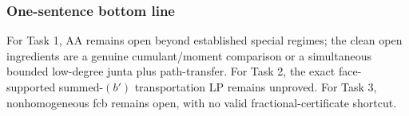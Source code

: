 \subsubsection{One-sentence bottom line}\label{one-sentence-bottom-line}

For Task 1, AA remains open beyond established special regimes; the clean open ingredients are a genuine cumulant/moment comparison or a simultaneous bounded low-degree junta plus path-transfer. For Task 2, the exact face-supported summed-\((b')\) transportation LP remains unproved. For Task 3, nonhomogeneous fcb remains open, with no valid fractional-certificate shortcut.
